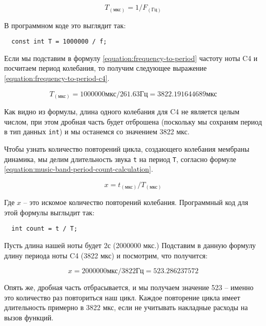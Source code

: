 \documentclass[../sparc.tex]{subfiles}
\begin{document}
\begin{equation}
  T_{(\mbox{мкс})} = 1 / F_{(\mbox{Гц})}
  \label{equation:frequency-to-period}
\end{equation}

В программном коде это выглядит так:

\begin{verbatim}
  const int T = 1000000 / f;
\end{verbatim}

Если мы подставим в формулу \ref{equation:frequency-to-period} частоту ноты C4 и
посчитаем период колебания, то получим следующее выражение
\ref{equation:frequency-to-period-c4}.

\begin{equation}
  T_{(\mbox{мкс})} = 1000000 \mbox{мкс} / 261.63 \mbox{Гц} = 3822.191644689 \mbox{мкс}
  \label{equation:frequency-to-period-c4}
\end{equation}

Как видно из формулы, длина одного колебания для C4 не является целым числом,
при этом дробная часть будет отброшена (поскольку мы сохраням период в тип
данных \texttt{int}) и мы останемся со значением 3822 мкс.

Чтобы узнать количество повторений цикла, создающего колебания мембраны
динамика, мы делим длительность звука \texttt{t} на период \texttt{T}, согласно
формуле \ref{equation:music-band-period-count-calculation}.

\begin{equation}
  x = t_{(\mbox{мкс})} / T_{(\mbox{мкс})}
  \label{equation:music-band-period-count-calculation}
\end{equation}

Где $x$ -- это искомое количество повторений колебания.  Программный код для этой
формулы выглыдит так:

\begin{verbatim}
  int count = t / T;
\end{verbatim}

Пусть длина нашей ноты будет 2с (2000000 мкс.)  Подставим в данную формулу длину
периода ноты C4 (3822 мкс) и посмотрим, что получится:

\begin{equation}
  x = 2000000 \mbox{мкс} / 3822 \mbox{Гц} = 523.286237572
\end{equation}

Опять же, дробная часть отбрасывается, и мы получаем значение 523 -- именно это
количество раз повториться наш цикл.  Каждое повторение цикла имеет длительность
примерно в 3822 мкс, если не учитывать накладные расходы на вызов функций.
\end{document}
